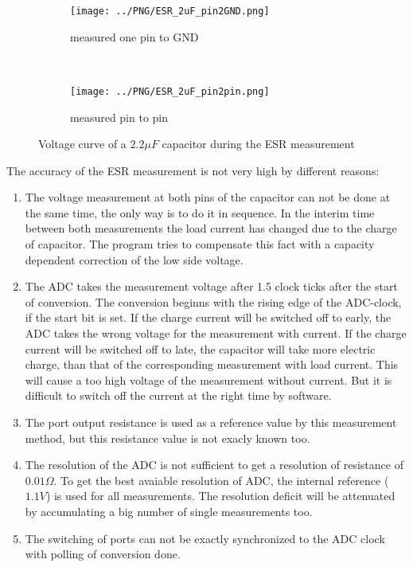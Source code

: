 \begin{figure}[H]
  \begin{subfigure}[b]{.5\textwidth}
    \centering
    \texttt{[image: ../PNG/ESR\_2uF\_pin2GND.png]}
    \caption{measured one pin to GND}
  \end{subfigure}
  ~ 
  \begin{subfigure}[b]{.5\textwidth}
    \centering
    \texttt{[image: ../PNG/ESR\_2uF\_pin2pin.png]}
    \caption{measured pin to pin}
  \end{subfigure}
  \caption{Voltage curve of a \(2.2\mu F\) capacitor during the ESR measurement}
  \label{pic:esr2}
\end{figure}



The accuracy of the ESR measurement is not very high by different reasons:
\begin{enumerate}
\item The voltage measurement at both pins of the capacitor can not be done at the same time, the only way is to do it in sequence.
In the interim time between both measurements the load current has changed due to the charge of capacitor.
The program tries to compensate this fact with a capacity dependent correction of the low side voltage.
\item The ADC takes the measurement voltage after 1.5 clock ticks after the start of conversion.
The conversion beginns with the rising edge of the ADC-clock, if the start bit is set.
If the charge current will be switched off to early, the ADC takes the wrong voltage for the measurement with current.
If the charge current will be switched off to late, the capacitor will take more electric charge, than that of the
corresponding measurement with load current. This will cause a too high voltage of the measurement without current.
But it is difficult to switch off the current at the right time by software. 
\item The port output resistance is used as a reference value by this measurement method, but this resistance value is
not exacly known too.
\item The resolution of the ADC is not sufficient to get a resolution of resistance of \(0.01\Omega\).
To get the best avaiable resolution of ADC, the internal reference (\(1.1V\)) is used for all measurements.
The resolution deficit will be attenuated by accumulating a big number of single measurements too.
\item The switching of ports can not be exactly synchronized to the ADC clock with polling of conversion done.
\end{enumerate}

